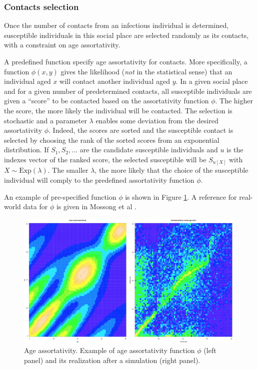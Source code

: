 \documentclass[11pt, onecolumn]{article}
\begin{document}
\subsubsection*{Contacts selection}

Once the number of contacts from an infectious individual is determined, susceptible individuals in this social place are selected randomly as its contacts, with a constraint on age assortativity.

A predefined function specify age assortativity for contacts. More specifically, a function $\phi(x,y)$ gives the likelihood (\emph{not} in the statistical sense) that an individual aged $x$ will contact another individual aged $y$.
In a given social place and for a given number of predetermined contacts, all susceptible individuals are given a ``score'' to be contacted based on the assortativity function $\phi$. 
The higher the score, the more likely the individual will be contacted. The selection is stochastic and a parameter $\lambda$ enables some deviation from the desired assortativity $\phi$.
Indeed, the scores are sorted and the susceptible contact is selected by choosing the rank of the sorted scores from an exponential distribution. If $S_1, S_2, ...$ are the candidate susceptible individuals and $u$ is the indexes vector of the ranked score, the selected susceptible will be $S_{u[X]}$ with $ X \sim \text{Exp}(\lambda) $. The smaller $\lambda$, the more likely that the choice of the susceptible individual will comply to the predefined assortativity function $\phi$.

An example of pre-specified function $\phi$ is shown in Figure \ref{fig:age_assortativity}. A reference for real-world data for $\phi$ is given in Mossong et al \cite{Mossong:2008vz}.


\begin{figure}[!ht]
\centering
    \includegraphics[angle=0,width=0.99\textwidth]{figures/age_assort.png}
\caption{Age assortativity. Example of age assortativity function $\phi$ (left panel) and its realization after a simulation (right panel).}
\label{fig:age_assortativity}
\end{figure}
\end{document}
